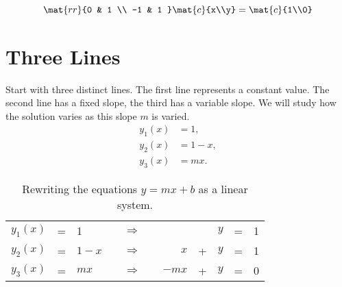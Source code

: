   \begin{equation*}   %
      \mat{rr}{0 & 1 \\ -1 & 1 }\mat{c}{x\\y} = \mat{c}{1\\0}
  \end{equation*}


\section{Three Lines}  %
Start with three distinct lines. The first line represents a constant value. The second line has a fixed slope, the third has a variable slope. We will study how the solution varies as this slope $m$ is varied.
  \begin{equation*}   %
     \begin{split}
       y_{1}(x) &= 1, \\
       y_{2}(x) &= 1 - x, \\
       y_{3}(x) &= m x.
     \end{split}
  \end{equation*}


  \begin{table}[htbp]
  \caption{Rewriting the equations $y=mx+b$ as a linear system.}
  \begin{center}
    \begin{tabular}{lclcccrcrcl}
      $y_{1}(x)$ &=&  1       && $\Rightarrow$ && &&          $y$ &=& 1 \\
      $y_{2}(x)$ &=&  $1 - x$ && $\Rightarrow$ && $x$   & + & $y$ &=& 1 \\
      $y_{3}(x)$ &=&  $m x$   && $\Rightarrow$ && $-mx$ & + & $y$ &=& 0 \\
    \end{tabular}
  \end{center}
  \end{table}%


